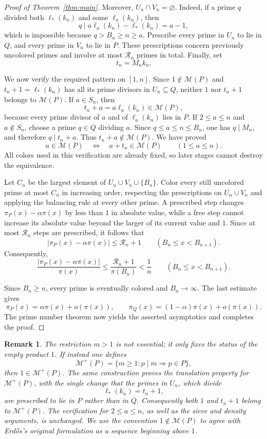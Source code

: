 \documentclass[a4paper,11pt]{amsart}
\newtheorem{remark}[theorem]{Remark}
\newcommand{\cM}{\mathcal M}
\begin{document}
\begin{proof}[Proof of Theorem~\ref{thm:main}]
Moreover, \(U_n\cap V_n=\varnothing\).
Indeed, if a prime \(q\) divided both \(\ell_*(k_n)\) and some \(\ell_a(k_n)\), then
\[
q\mid a\ell_a(k_n)-\ell_*(k_n)=a-1,
\]
which is impossible because \(q>B_n\geq n\geq a\).
Prescribe every prime in \(U_n\) to lie in \(Q\), and every prime in \(V_n\) to lie in \(P\).
These prescriptions concern previously uncolored primes and involve at most \(\mathcal R_n\) primes in total.
Finally, set
\[
t_n=M_nk_n.
\]

We now verify the required pattern on \([1,n]\).
Since \(1\notin\cM(P)\) and
\(t_n+1=\ell_*(k_n)\) has all its prime divisors in \(U_n\subseteq Q\), neither \(1\) nor \(t_n+1\) belongs to \(\cM(P)\).
If \(a\in S_n\), then
\[
t_n+a=a\ell_a(k_n)\in\cM(P),
\]
because every prime divisor of \(a\) and of \(\ell_a(k_n)\) lies in \(P\).
If \(2\leq a\leq n\) and \(a\notin S_n\), choose a prime \(q\in Q\) dividing \(a\).
Since \(q\leq a\leq n\leq B_n\), one has \(q\mid M_n\), and therefore \(q\mid t_n+a\).
Thus \(t_n+a\notin\cM(P)\).
We have proved
\[
a\in\cM(P)
\quad\Longleftrightarrow\quad
a+t_n\in\cM(P)
\qquad (1\leq a\leq n).
\]
All colors used in this verification are already fixed, so later stages cannot destroy the equivalence.

Let \(C_n\) be the largest element of
\(U_n\cup V_n\cup\{B_n\}\).
Color every still uncolored prime at most \(C_n\) in increasing order, respecting the prescriptions on \(U_n\cup V_n\) and applying the balancing rule at every other prime.
A prescribed step changes
\(\pi_P(x)-\alpha\pi(x)\) by less than \(1\) in absolute value, while a free step cannot increase its absolute value beyond the larger of its current value and \(1\).
Since at most \(\mathcal R_n\) steps are prescribed, it follows that
\[
|\pi_P(x)-\alpha\pi(x)|
\leq\mathcal R_n+1
\qquad (B_n\leq x<B_{n+1}).
\]
Consequently,
\[
\frac{|\pi_P(x)-\alpha\pi(x)|}{\pi(x)}
\leq
\frac{\mathcal R_n+1}{\pi(B_n)}
<\frac1n
\qquad (B_n\leq x<B_{n+1}).
\]

Since \(B_n\geq n\), every prime is eventually colored and \(B_n\to\infty\).
The last estimate gives
\[
\pi_P(x)=\alpha\pi(x)+o(\pi(x)),
\qquad
\pi_Q(x)=(1-\alpha)\pi(x)+o(\pi(x)).
\]
The prime number theorem now yields the asserted asymptotics and completes the proof.
\end{proof}

\begin{remark}
The restriction \(m>1\) is not essential; it only fixes the status of
the empty product \(1\).  If instead one defines
\[
\cM^{+}(P)
   =\{m\geq1:p\mid m\Longrightarrow p\in P\},
\]
then \(1\in\cM^{+}(P)\).  The same construction proves the translation
property for \(\cM^{+}(P)\), with the single change that the primes in
\(U_n\), which divide
\[
\ell_*(k_n)=t_n+1,
\]
are prescribed to lie in \(P\) rather than in \(Q\).  Consequently both
\(1\) and \(t_n+1\) belong to \(\cM^{+}(P)\).  The verification for
\(2\leq a\leq n\), as well as the sieve and density arguments, is
unchanged.  We use the convention \(1\notin\cM(P)\) to agree with
Erdős's original formulation as a sequence beginning above \(1\).
\end{remark}
\end{document}
